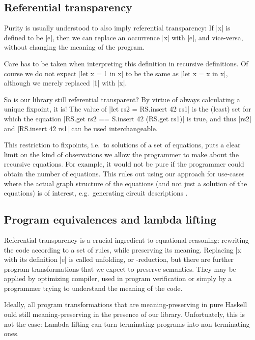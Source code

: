 \documentclass[manuscript,anonymous,screen,acmsmall]{acmart}
\begin{document}
\subsection{Referential transparency}

Purity is usually understood to also imply referential transparency: If |x| is defined to be |e|, then we can replace an occurrence |x| with |e|, and vice-versa, without changing the meaning of the program.

Care has to be taken when interpreting this definition in recursive definitions. Of course we do not expect |let x = 1 in x| to be the same as |let x = x in x|, although we merely replaced |1| with |x|.

So is our library still referential transparent? By virtue of always calculating a unique fixpoint, it is!  The value of |let rs2 = RS.insert 42 rs1| is the (least) set for which the equation |RS.get rs2 == S.insert 42 (RS.get rs1)| is true, and thus |rs2| and |RS.insert 42 rs1| can be used interchangeable.

This restriction to fixpoints, i.e.\ to solutions of a set of equations, puts a clear limit on the kind of observations we allow the programmer to make about the recursive equations. For example, it would not be pure if the programmer could obtain the number of equations. This rules out using our approach for use-cases where the actual graph structure of the equations (and not just a solution of the equations) is of interest, e.g.\ generating circuit descriptions \cite{observable-sharing}.

\subsection{Program equivalences and lambda lifting}\label{sec:sat}

Referential transparency is a crucial ingredient to equational reasoning: rewriting the code according to a set of rules, while preserving its meaning. Replacing |x| with its definition |e| is called unfolding, or \textdelta-reduction, but there are further program transformations that we expect to preserve semantics. They may be applied by optimizing compiler, used in program verification or simply by a programmer trying to understand the meaning of the code.

Ideally, all program transformations that are meaning-preserving in pure Haskell ould still meaning-preserving in the presence of our library. Unfortuately, this is not the case: Lambda lifting can turn terminating programs into non-terminating ones.
\end{document}
